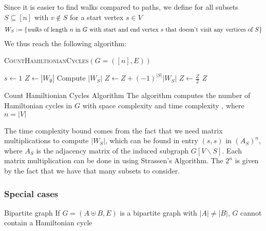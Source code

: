 Since it is easier to find walks compared to paths, we define for all subsets $S \subseteq [n]$ with $v \notin S$ for a start vertex $s \in V$
\begin{align*}
    W_S := \{ \text{\textit{walks} of length $n$ in $G$ with start and end vertex $s$ that doesn't visit any vertices of }S \}
\end{align*}
We thus reach the following algorithm:
\begin{algorithm}
    \caption{\textsc{CountHamiltionianCycles}$(G = ([n], E))$}
    \begin{algorithmic}[1]
        \State $s \gets 1$ 
        \State $Z \gets |W_{\emptyset}|$ 
            \State Compute $|W_S|$ 
            \State $Z \gets Z + (-1)^{|S|}|W_S|$ 
        \EndFor
        \State $Z \gets \frac{Z}{2}$ 
        \State \Return $Z$ 
    \end{algorithmic}
\end{algorithm}

\begin{theorem}[]{Count Hamiltionian Cycles Algorithm}
    The algorithm computes the number of Hamiltonian cycles in $G$ with space complexity  and time complexity , where $n = |V|$
\end{theorem}
The time complexity bound comes from the fact that we need  matrix multiplications to compute $|W_S|$, which can be found in entry $(s, s)$ in $(A_S)^n$, where $A_S$ is the adjacency matrix of the induced subgraph $G[V\backslash S]$.
Each matrix multiplication can be done in  using Strassen's Algorithm.
The $2^n$ is given by the fact that we have that many subsets to consider.


\newpage
\subsubsection{Special cases}
\begin{lemma}[]{Bipartite graph}
    If $G = (A \uplus B, E)$ is a bipartite graph with $|A| \neq |B|$, $G$ cannot contain a Hamiltonian cycle
\end{lemma}

